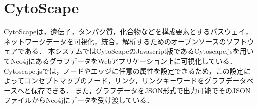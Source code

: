\section{CytoScape}\label{sec:cyto}
CytoScape\cite{cytoscape}は，遺伝子，タンパク質，化合物などを構成要素とするパスウェイ，ネットワークデータを可視化，統合，解析するためのオープンソースのソフトウェアである．
本システムではCytoScapeのJavascript版であるCytoscape.jsを用いてNeo4jにあるグラフデータをWebアプリケーション上に可視化している．
Cytoscape.jsでは，ノードやエッジに任意の属性を設定できるため，この設定によってコンセプトマップのノード，リンク，リンクキーワードをグラフデータベースへと保存できる．
また，グラフデータをJSON形式で出力可能でそのJSONファイルからNeo4jにデータを受け渡している．
